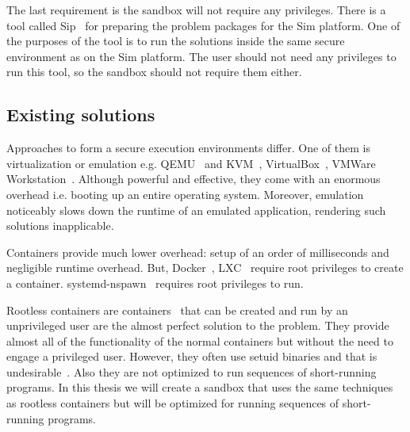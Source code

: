 \documentclass[en]{pracamgr}
\begin{document}
The last requirement is the sandbox will not require any privileges. There is a tool called Sip~\cite{sip} for preparing the problem packages for the Sim platform. One of the purposes of the tool is to run the solutions inside the same secure environment as on the Sim platform. The user should not need any privileges to run this tool, so the sandbox should not require them either.

\subsection{Existing solutions}

Approaches to form a secure execution environments differ. One of them is virtualization or emulation e.g. QEMU~\cite{qemu_website} and KVM~\cite{kvm_website}, VirtualBox~\cite{virtualbox_website}, VMWare Workstation~\cite{vmware_workstation_website}. Although powerful and effective, they come with an enormous overhead i.e. booting up an entire operating system. Moreover, emulation noticeably slows down the runtime of an emulated application, rendering such solutions inapplicable.

Containers provide much lower overhead: setup of an order of milliseconds and negligible runtime overhead. But, Docker~\cite{Merkel:2014:DLL:2600239.2600241}, LXC~\cite{conf/cisis/BeserraMEBSF15} require root privileges to create a container. systemd-nspawn~\cite{systemd_nspawn} requires root privileges to run.

Rootless containers are containers~\cite{rootless_containers_rs} that can be created and run by an unprivileged user are the almost perfect solution to the problem. They provide almost all of the functionality of the normal containers but without the need to engage a privileged user. However, they often use setuid binaries and that is undesirable~\cite{podman_rootless_containers_presentation}. Also they are not optimized to run sequences of short-running programs. In this thesis we will create a sandbox that uses the same techniques as rootless containers but will be optimized for running sequences of short-running programs.


\end{document}
